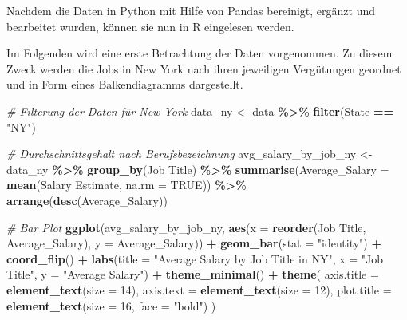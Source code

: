 \documentclass[
]{article}
\newenvironment{Shaded}{\begin{snugshade}}{\end{snugshade}}
\newcommand{\AttributeTok}[1]{\textcolor[rgb]{0.13,0.29,0.53}{#1}}
\newcommand{\CommentTok}[1]{\textcolor[rgb]{0.56,0.35,0.01}{\textit{#1}}}
\newcommand{\ConstantTok}[1]{\textcolor[rgb]{0.56,0.35,0.01}{#1}}
\newcommand{\DecValTok}[1]{\textcolor[rgb]{0.00,0.00,0.81}{#1}}
\newcommand{\FunctionTok}[1]{\textcolor[rgb]{0.13,0.29,0.53}{\textbf{#1}}}
\newcommand{\NormalTok}[1]{#1}
\newcommand{\OtherTok}[1]{\textcolor[rgb]{0.56,0.35,0.01}{#1}}
\newcommand{\SpecialCharTok}[1]{\textcolor[rgb]{0.81,0.36,0.00}{\textbf{#1}}}
\newcommand{\StringTok}[1]{\textcolor[rgb]{0.31,0.60,0.02}{#1}}
\begin{document}
Nachdem die Daten in Python mit Hilfe von Pandas bereinigt, ergänzt und
bearbeitet wurden, können sie nun in R eingelesen werden.

Im Folgenden wird eine erste Betrachtung der Daten vorgenommen. Zu
diesem Zweck werden die Jobs in New York nach ihren jeweiligen
Vergütungen geordnet und in Form eines Balkendiagramms dargestellt.

\begin{Shaded}
\begin{Highlighting}[]
\CommentTok{\# Filterung der Daten für New York}
\NormalTok{data\_ny }\OtherTok{\textless{}{-}}\NormalTok{ data }\SpecialCharTok{\%\textgreater{}\%}
  \FunctionTok{filter}\NormalTok{(State }\SpecialCharTok{==} \StringTok{"NY"}\NormalTok{)}

\CommentTok{\# Durchschnittsgehalt nach Berufsbezeichnung}
\NormalTok{avg\_salary\_by\_job\_ny }\OtherTok{\textless{}{-}}\NormalTok{ data\_ny }\SpecialCharTok{\%\textgreater{}\%}
  \FunctionTok{group\_by}\NormalTok{(}\StringTok{\textasciigrave{}}\AttributeTok{Job Title}\StringTok{\textasciigrave{}}\NormalTok{) }\SpecialCharTok{\%\textgreater{}\%}
  \FunctionTok{summarise}\NormalTok{(}\AttributeTok{Average\_Salary =} \FunctionTok{mean}\NormalTok{(}\StringTok{\textasciigrave{}}\AttributeTok{Salary Estimate}\StringTok{\textasciigrave{}}\NormalTok{, }\AttributeTok{na.rm =} \ConstantTok{TRUE}\NormalTok{)) }\SpecialCharTok{\%\textgreater{}\%}
  \FunctionTok{arrange}\NormalTok{(}\FunctionTok{desc}\NormalTok{(Average\_Salary))}

\CommentTok{\# Bar Plot}
\FunctionTok{ggplot}\NormalTok{(avg\_salary\_by\_job\_ny,}
       \FunctionTok{aes}\NormalTok{(}\AttributeTok{x =} \FunctionTok{reorder}\NormalTok{(}\StringTok{\textasciigrave{}}\AttributeTok{Job Title}\StringTok{\textasciigrave{}}\NormalTok{, Average\_Salary), }\AttributeTok{y =}\NormalTok{ Average\_Salary)) }\SpecialCharTok{+}
  \FunctionTok{geom\_bar}\NormalTok{(}\AttributeTok{stat =} \StringTok{"identity"}\NormalTok{) }\SpecialCharTok{+}
  \FunctionTok{coord\_flip}\NormalTok{() }\SpecialCharTok{+}
  \FunctionTok{labs}\NormalTok{(}\AttributeTok{title =} \StringTok{"Average Salary by Job Title in NY"}\NormalTok{,}
       \AttributeTok{x =} \StringTok{"Job Title"}\NormalTok{,}
       \AttributeTok{y =} \StringTok{"Average Salary"}\NormalTok{) }\SpecialCharTok{+}
  \FunctionTok{theme\_minimal}\NormalTok{() }\SpecialCharTok{+}
  \FunctionTok{theme}\NormalTok{(}
    \AttributeTok{axis.title =} \FunctionTok{element\_text}\NormalTok{(}\AttributeTok{size =} \DecValTok{14}\NormalTok{),}
    \AttributeTok{axis.text =} \FunctionTok{element\_text}\NormalTok{(}\AttributeTok{size =} \DecValTok{12}\NormalTok{),}
    \AttributeTok{plot.title =} \FunctionTok{element\_text}\NormalTok{(}\AttributeTok{size =} \DecValTok{16}\NormalTok{, }\AttributeTok{face =} \StringTok{"bold"}\NormalTok{)}
\NormalTok{  )}
\end{Highlighting}
\end{Shaded}
\end{document}
